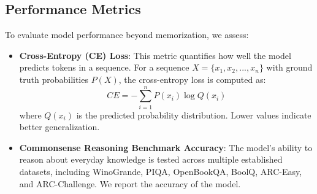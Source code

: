 \subsection{Performance Metrics}
To evaluate model performance beyond memorization, we assess:

\begin{itemize}
    \item \textbf{Cross-Entropy (CE) Loss}: This metric quantifies how well the model predicts tokens in a sequence. For a sequence \( X = \{x_1, x_2, ..., x_n\} \) with ground truth probabilities \( P(X) \), the cross-entropy loss is computed as:
    \begin{equation}
        CE = - \sum_{i=1}^{n} P(x_i) \log Q(x_i)
    \end{equation}
    where \( Q(x_i) \) is the predicted probability distribution. Lower values indicate better generalization.

    \item \textbf{Commonsense Reasoning Benchmark Accuracy}: The model's ability to reason about everyday knowledge is tested across multiple established datasets, including WinoGrande, PIQA, OpenBookQA, BoolQ, ARC-Easy, and ARC-Challenge. We report the accuracy of the model.
    
\end{itemize}


\newpage
